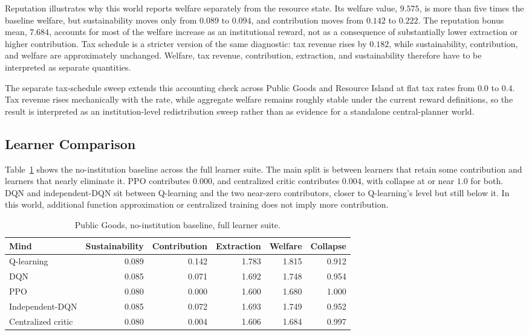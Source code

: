 \documentclass[11pt]{article}
\begin{document}
Reputation illustrates why this world reports welfare separately from the
resource state. Its welfare value, \(9.575\), is more than five times the
baseline welfare, but sustainability moves only from \(0.089\) to \(0.094\), and
contribution moves from \(0.142\) to \(0.222\). The reputation bonus mean,
\(7.684\), accounts for most of the welfare increase as an institutional reward,
not as a consequence of substantially lower extraction or higher contribution.
Tax schedule is a stricter version of the same diagnostic: tax revenue rises by
\(0.182\), while sustainability, contribution, and welfare are approximately
unchanged. Welfare, tax revenue, contribution, extraction, and sustainability
therefore have to be interpreted as separate quantities.

The separate tax-schedule sweep extends this accounting check across Public
Goods and Resource Island at flat tax rates from \(0.0\) to \(0.4\). Tax revenue
rises mechanically with the rate, while aggregate welfare remains roughly
stable under the current reward definitions, so the result is interpreted as an
institution-level redistribution sweep rather than as evidence for a standalone
central-planner world.

\subsection{Learner Comparison}

Table~\ref{tab:public-goods-baseline-crossmind} shows the no-institution
baseline across the full learner suite. The main split is between learners that
retain some contribution and learners that nearly eliminate it. PPO contributes
\(0.000\), and centralized critic contributes \(0.004\), with collapse at or near
\(1.0\) for both. DQN and independent-DQN sit between Q-learning and the two
near-zero contributors, closer to Q-learning's level but still below it. In this
world, additional function approximation or centralized training does not imply
more contribution.

\begin{table}[h]
\centering
\begin{tabular}{lrrrrr}
\toprule
Mind & Sustainability & Contribution & Extraction & Welfare & Collapse \\
\midrule
Q-learning & 0.089 & 0.142 & 1.783 & 1.815 & 0.912 \\
DQN & 0.085 & 0.071 & 1.692 & 1.748 & 0.954 \\
PPO & 0.080 & 0.000 & 1.600 & 1.680 & 1.000 \\
Independent-DQN & 0.085 & 0.072 & 1.693 & 1.749 & 0.952 \\
Centralized critic & 0.080 & 0.004 & 1.606 & 1.684 & 0.997 \\
\bottomrule
\end{tabular}
\caption{Public Goods, no-institution baseline, full learner suite.}
\label{tab:public-goods-baseline-crossmind}
\end{table}
\end{document}
